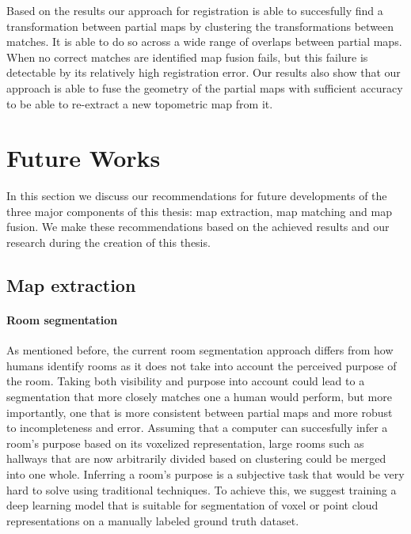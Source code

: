 Based on the results our approach for registration is able to succesfully find a transformation between partial maps by clustering the transformations between matches. It is able to do so across a wide range of overlaps between partial maps. When no correct matches are identified map fusion fails, but this failure is detectable by its relatively high registration error. Our results also show that our approach is able to fuse the geometry of the partial maps with sufficient accuracy to be able to re-extract a new topometric map from it. 

\pagebreak

\section{Future Works}
In this section we discuss our recommendations for future developments of the three major components of this thesis: map extraction, map matching and map fusion. We make these recommendations based on the achieved results and our research during the creation of this thesis. 

\subsection{Map extraction}

\paragraph{Room segmentation}
As mentioned before, the current room segmentation approach differs from how humans identify rooms as it does not take into account the perceived purpose of the room. Taking both visibility and purpose into account could lead to a segmentation that more closely matches one a human would perform, but more importantly, one that is more consistent between partial maps and more robust to incompleteness and error. Assuming that a computer can succesfully infer a room's purpose based on its voxelized representation, large rooms such as hallways that are now arbitrarily divided based on clustering could be merged into one whole. Inferring a room's purpose is a subjective task that would be very hard to solve using traditional techniques. To achieve this, we suggest training a deep learning model that is suitable for segmentation of voxel or point cloud representations on a manually labeled ground truth dataset. 


